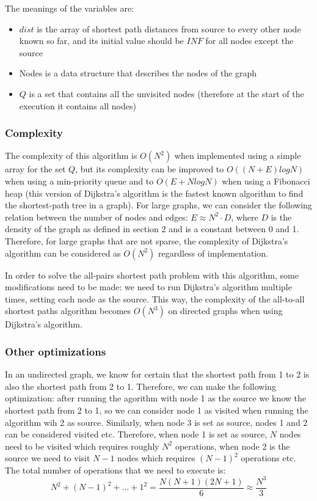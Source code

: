 \documentclass[runningheads]{llncs}
\begin{document}
The meanings of the variables are:
\begin{itemize}
	\item $dist$ is the array of shortest path distances from source to every other node known so far, and its initial value should be $INF$ for all nodes except the source
	\item Nodes is a data structure that describes the nodes of the graph
	\item $Q$ is a set that contains all the unvisited nodes (therefore at the start of the execution it contains all nodes)
\end{itemize}

\subsubsection{Complexity}
The complexity of this algorithm is $O(N^2)$ when implemented using a simple array for the set $Q$, but its complexity can be improved to  $O((N+E)logN)$ when using a min-priority queue and to $O(E+NlogN)$ when using a Fibonacci heap (this version of Dijkstra's algorithm is the fastest known algorithm to find the shortest-path tree in a graph). For large graphs, we can consider the following relation between the number of nodes and edges: $E \approx N^2 \cdot D$, where $D$ is the density of the graph as defined in section 2 and is a constant between 0 and 1. Therefore, for large graphs that are not sparse, the complexity of Dijkstra's algorithm can be considered as $O(N^2)$ regardless of implementation.

In order to solve the all-pairs shortest path problem with this algorithm, some modifications need to be made: we need to run Dijkstra's algorithm multiple times, setting each node as the source. This way, the complexity of the all-to-all shortest paths algorithm becomes $O(N^3)$ on directed graphs when using Dijkstra's algorithm.

\subsubsection{Other optimizations}
In an undirected graph, we know for certain that the shortest path from 1 to 2 is also the shortest path from 2 to 1. Therefore, we can make the following optimization: after running the agorithm with node 1 as the source we know the shortest path from 2 to 1, so we can consider node 1 as visited when running the algorithm wih 2 as source. Similarly, when node 3 is set as source, nodes 1 and 2 can be considered visited etc. Therefore, when node 1 is set as source, $N$ nodes need to be visited which requires roughly $N^2$ operations, when node 2 is the source we need to visit $N-1$ nodes which requires $(N-1)^2$ operations etc. The total number of operations that we need to execute is:
\begin{equation}
N^2+(N-1)^2+...+1^2 = \frac{N(N+1)(2N+1)}{6} \approx \frac{N^3}{3}
\end{equation}
\end{document}

